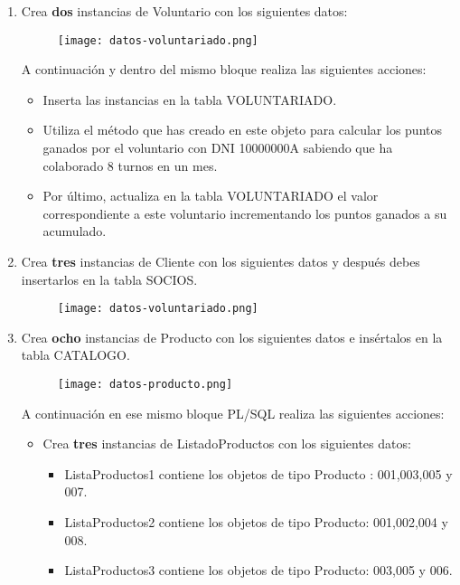 \begin{enumerate}[label=\alph*)]
    \item Crea \textbf{dos} instancias de Voluntario con los siguientes datos:

     \begin{figure}[H]
        \centering
        \texttt{[image: datos-voluntariado.png]}
     \end{figure}

    A continuación y dentro del mismo bloque realiza las siguientes acciones:
    \begin{itemize}
        \item Inserta las instancias en la tabla VOLUNTARIADO.
        \item Utiliza el método que has creado en este objeto para calcular los puntos ganados por el voluntario con DNI 10000000A sabiendo que ha colaborado 8 turnos en un mes.
        \item Por último, actualiza en la tabla VOLUNTARIADO el valor correspondiente a este voluntario incrementando los puntos ganados a su acumulado.
    \end{itemize}

    \item Crea \textbf{tres} instancias de Cliente con los siguientes datos y después debes insertarlos en la tabla SOCIOS.

    \begin{figure}[H]
        \centering
        \texttt{[image: datos-voluntariado.png]}
    \end{figure}

    \item Crea \textbf{ocho} instancias de Producto con los siguientes datos e insértalos en la tabla CATALOGO.

    \begin{figure}[H]
        \centering
        \texttt{[image: datos-producto.png]}
    \end{figure}

    A continuación en ese mismo bloque PL/SQL realiza las siguientes acciones:

    \begin{itemize}
        \item Crea \textbf{tres} instancias de ListadoProductos con los siguientes datos:
        \begin{itemize}
            \item ListaProductos1 contiene los objetos de tipo Producto : 001,003,005 y 007.
            \item ListaProductos2 contiene los objetos de tipo Producto: 001,002,004 y 008.
            \item ListaProductos3 contiene los objetos de tipo Producto: 003,005 y 006.
        \end{itemize}


\end{itemize}
\end{enumerate}
